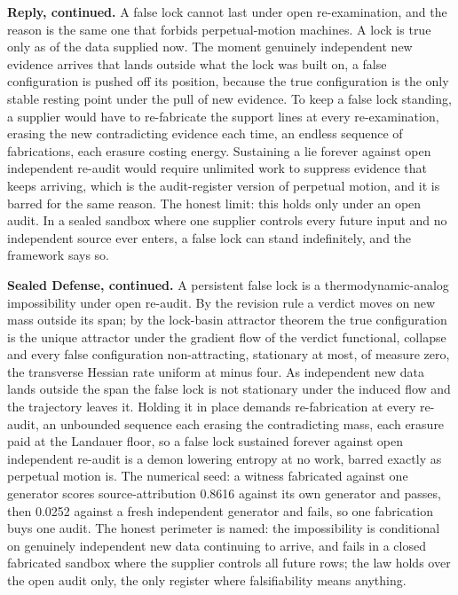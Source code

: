\documentclass[10pt,twocolumn]{article}
\begin{document}
\textbf{Reply, continued.} A false lock cannot last under open
re-examination, and the reason is the same one that forbids
perpetual-motion machines. A lock is true only as of the data supplied
now. The moment genuinely independent new evidence arrives that lands
outside what the lock was built on, a false configuration is pushed off
its position, because the true configuration is the only stable resting
point under the pull of new evidence. To keep a false lock standing, a
supplier would have to re-fabricate the support lines at every
re-examination, erasing the new contradicting evidence each time, an
endless sequence of fabrications, each erasure costing energy.
Sustaining a lie forever against open independent re-audit would require
unlimited work to suppress evidence that keeps arriving, which is the
audit-register version of perpetual motion, and it is barred for the
same reason. The honest limit: this holds only under an open audit. In a
sealed sandbox where one supplier controls every future input and no
independent source ever enters, a false lock can stand indefinitely, and
the framework says so.

\textbf{Sealed Defense, continued.} A persistent false lock is a
thermodynamic-analog impossibility under open re-audit. By the revision
rule a verdict moves on new mass outside its span; by the lock-basin
attractor theorem the true configuration is the unique attractor under
the gradient flow of the verdict functional, collapse and every false
configuration non-attracting, stationary at most, of measure zero, the
transverse Hessian rate uniform at minus four. As independent new data
lands outside the span the false lock is not stationary under the
induced flow and the trajectory leaves it. Holding it in place demands
re-fabrication at every re-audit, an unbounded sequence each erasing the
contradicting mass, each erasure paid at the Landauer floor, so a false
lock sustained forever against open independent re-audit is a demon
lowering entropy at no work, barred exactly as perpetual motion is. The
numerical seed: a witness fabricated against one generator scores
source-attribution 0.8616 against its own generator and passes, then
0.0252 against a fresh independent generator and fails, so one
fabrication buys one audit. The honest perimeter is named: the
impossibility is conditional on genuinely independent new data
continuing to arrive, and fails in a closed fabricated sandbox where the
supplier controls all future rows; the law holds over the open audit
only, the only register where falsifiability means anything.
\end{document}
